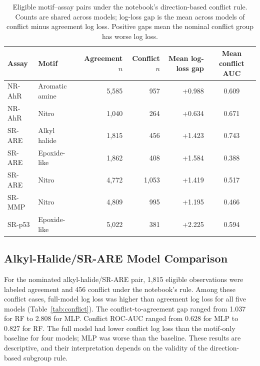 \documentclass[conference]{IEEEtran}
\begin{document}
\begin{table}[t]
\centering
\caption{Eligible motif--assay pairs under the notebook's direction-based conflict rule. Counts are shared across models; log-loss gap is the mean across models of conflict minus agreement log loss. Positive gaps mean the nominal conflict group has worse log loss.}
\label{tab:allconflict}
\footnotesize
\begin{tabular}{llrrrc}
\toprule
Assay & Motif & Agreement $n$ & Conflict $n$ & Mean log-loss gap & Mean conflict AUC \\
\midrule
NR-AhR & Aromatic amine & 5,585 & 957 & +0.988 & 0.609 \\
NR-AhR & Nitro & 1,040 & 264 & +0.634 & 0.671 \\
SR-ARE & Alkyl halide & 1,815 & 456 & +1.423 & 0.743 \\
SR-ARE & Epoxide-like & 1,862 & 408 & +1.584 & 0.388 \\
SR-ARE & Nitro & 4,772 & 1,053 & +1.419 & 0.517 \\
SR-MMP & Nitro & 4,809 & 995 & +1.195 & 0.466 \\
SR-p53 & Epoxide-like & 5,022 & 381 & +2.225 & 0.594 \\
\bottomrule
\end{tabular}
\end{table}

\subsection{Alkyl-Halide/SR-ARE Model Comparison}
For the nominated alkyl-halide/SR-ARE pair, 1,815 eligible observations were labeled agreement and 456 conflict under the notebook's rule. Among these conflict cases, full-model log loss was higher than agreement log loss for all five models (Table~\ref{tab:conflict}). The conflict-to-agreement gap ranged from 1.037 for RF to 2.808 for MLP. Conflict ROC-AUC ranged from 0.628 for MLP to 0.827 for RF. The full model had lower conflict log loss than the motif-only baseline for four models; MLP was worse than the baseline. These results are descriptive, and their interpretation depends on the validity of the direction-based subgroup rule.
\end{document}
